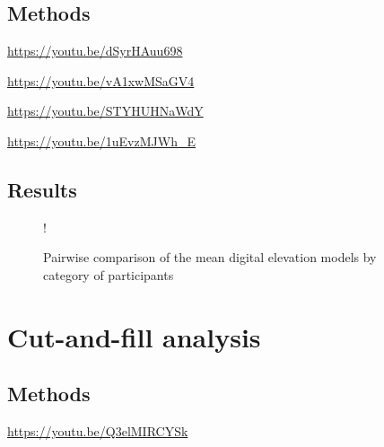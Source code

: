 \documentclass[Afour,sageh,times]{sagej}
\begin{document}
\subsection{Methods}













\noindent \url{https://youtu.be/dSyrHAuu698}

\noindent \url{https://youtu.be/vA1xwMSaGV4}

\noindent \url{https://youtu.be/STYHUHNaWdY}

\noindent  \url{https://youtu.be/1uEvzMJWh_E}




\subsection{Results}

\begin{figure}%
\begin{center}
\resizebox {\textwidth} {!} {}
\caption{Pairwise comparison of the mean digital elevation models by category of participants}
\label{fig:comparison}
\end{center}
\end{figure}


%

\section{Cut-and-fill analysis}
\subsection{Methods}

\url{https://youtu.be/Q3elMIRCYSk}
\end{document}
